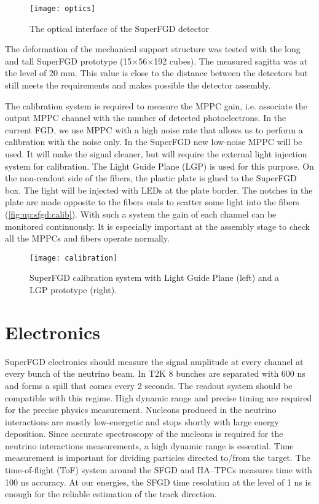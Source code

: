\documentclass[main.tex]{subfiles}
\begin{document}
\begin{figure}[!ht]
	\centering
	\texttt{[image: optics]}
	\caption{The optical interface of the SuperFGD detector}
	\label{fig:up:sfgd:optics}
\end{figure}

The deformation of the mechanical support structure was tested with the long and tall SuperFGD prototype (15$\times$56$\times$192 cubes). The measured sagitta was at the level of 20 mm. This value is close to the distance between the detectors but still meets the requirements and makes possible the detector assembly.

The calibration system is required to measure the MPPC gain, i.e. associate the output MPPC channel with the number of detected photoelectrons. In the current FGD, we use MPPC with a high noise rate that allows us to perform a calibration with the noise only. In the SuperFGD new low-noise MPPC will be used. It will make the signal cleaner, but will require the external light injection system for calibration. The Light Guide Plane (LGP) is used for this purpose. On the non-readout side of the fibers, the plastic plate is glued to the SuperFGD box. The light will be injected with LEDs at the plate border. The notches in the plate are made opposite to the fibers ends to scatter some light into the fibers (\autoref{fig:up:sfgd:calib}). With such a system the gain of each channel can be monitored continuously. It is especially important at the assembly stage to check all the MPPCs and fibers operate normally.

\begin{figure}[!ht]
	\centering
	\texttt{[image: calibration]}
	\caption{SuperFGD calibration system with Light Guide Plane (left) and a LGP prototype (right).}
	\label{fig:up:sfgd:calib}
\end{figure}

\section{Electronics}
\label{sec:up:sfgd:ele}
SuperFGD electronics should measure the signal amplitude at every channel at every bunch of the neutrino beam. In T2K 8 bunches are separated with 600 ns and forms a spill that comes every 2 seconds. The readout system should be compatible with this regime. High dynamic range and precise timing are required for the precise physics measurement. Nucleons produced in the neutrino interactions are mostly low-energetic and stops shortly with large energy deposition. Since accurate spectroscopy of the nucleons is required for the neutrino interactions measurements, a high dynamic range is essential. Time measurement is important for dividing particles directed to/from the target. The time-of-flight (ToF) system around the SFGD and HA--TPCs measures time with 100 ns accuracy. At our energies, the SFGD time resolution at the level of 1 ns is enough for the reliable estimation of the track direction.
\end{document}
